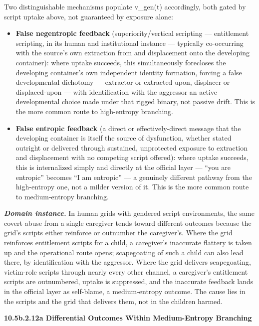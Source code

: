 \documentclass[
]{article}
\begin{document}
Two distinguishable mechanisms populate v\_gen(t) accordingly, both
gated by script uptake above, not guaranteed by exposure alone:

\begin{itemize}
\item
  \textbf{False negentropic feedback} (superiority/vertical scripting
  --- entitlement scripting, in its human and institutional instance ---
  typically co-occurring with the source's own extraction from and
  displacement onto the developing container): where uptake succeeds,
  this simultaneously forecloses the developing container's own
  independent identity formation, forcing a false developmental
  dichotomy --- extractor or extracted-upon, displacer or displaced-upon
  --- with identification with the aggressor an active developmental
  choice made under that rigged binary, not passive drift. This is the
  more common route to high-entropy branching.
\item
  \textbf{False entropic feedback} (a direct or effectively-direct
  message that the developing container is itself the source of
  dysfunction, whether stated outright or delivered through sustained,
  unprotected exposure to extraction and displacement with no competing
  script offered): where uptake succeeds, this is internalized simply
  and directly at the official layer --- ``you are entropic'' becomes
  ``I am entropic'' --- a genuinely different pathway from the
  high-entropy one, not a milder version of it. This is the more common
  route to medium-entropy branching.
\end{itemize}

\emph{\textbf{Domain instance.}} In human grids with gendered script
environments, the same covert abuse from a single caregiver tends toward
different outcomes because the grid's scripts either reinforce or
outnumber the caregiver's. Where the grid reinforces entitlement scripts
for a child, a caregiver's inaccurate flattery is taken up and the
operational route opens; scapegoating of such a child can also lead
there, by identification with the aggressor. Where the grid delivers
scapegoating, victim-role scripts through nearly every other channel, a
caregiver's entitlement scripts are outnumbered, uptake is suppressed,
and the inaccurate feedback lands in the official layer as self-blame, a
medium-entropy outcome. The cause lies in the scripts and the grid that
delivers them, not in the children harmed.

\textbf{10.5b.2.12a Differential Outcomes Within Medium-Entropy
Branching}
\end{document}
